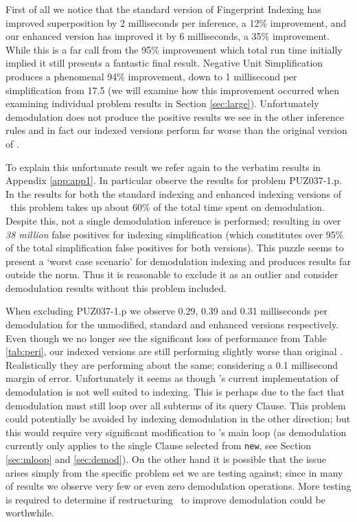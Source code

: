 First of all we notice that the standard version of Fingerprint Indexing has
improved superposition by 2 milliseconds per inference, a 12\% improvement,
and our enhanced version has improved it by 6 milliseconds, a 35\% improvement.
While this is a far call from the 95\% improvement which total run time initially
implied it still presents a fantastic final result. Negative Unit Simplification
produces a phenomenal 94\% improvement, down to 1 millisecond per simplification from 17.5
(we will examine how this improvement occurred when examining individual problem
results in Section \ref{sec:large}).
Unfortunately demodulation does not produce the positive results we see in the other
inference rules and in fact our indexed versions perform far worse than the original
version of \beagle.

To explain this unfortunate result we refer again to the verbatim results in
Appendix \ref{app:app1}. In particular observe the results for problem PUZ037-1.p.
In the results for both the standard indexing and enhanced indexing versions of \beagle\ 
this problem takes up about 60\% of the total time spent on demodulation. Despite
this, not a single demodulation inference is performed; resulting in over \emph{38 million}
false positives for indexing simplification (which constitutes over 95\% of the
total simplification false positives for both versions). This puzzle seems to present
a `worst case scenario' for demodulation indexing and produces results far outside the norm.
Thus it is reasonable to exclude it as an outlier and consider demodulation results
without this problem included.

When excluding PUZ037-1.p we observe 0.29, 0.39 and 0.31 milliseconds per demodulation
for the unmodified, standard and enhanced versions respectively. Even though we no
longer see the significant loss of performance from Table \ref{tab:peri}, our
indexed versions are still performing slightly worse than original \beagle. Realistically
they are performing about the same; considering a 0.1 millisecond margin of error. Unfortunately
it seems as though \beagle's current implementation of demodulation is not well suited
to indexing. This is perhaps due to the fact that demodulation must still loop
over all subterms of its query Clause. This problem could potentially be avoided by
indexing demodulation in the other direction; but this would require very significant
modification to \beagle's main loop (as demodulation currently only applies to
the single Clause selected from \verb!new!, see Section \ref{sec:mloop} and \ref{sec:demod}).
On the other hand it is possible that the issue arises simply from
the specific problem set we are testing against; since in many of results we observe
very few or even zero demodulation operations. More testing is required to determine
if restructuring \beagle\ to improve demodulation could be worthwhile.


